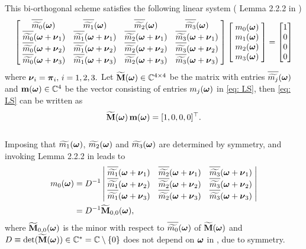 This bi-orthogonal scheme satisfies the following linear system (
Lemma 2.2.2 in \cite{cohen1993compactly} )
\begin{align}\label{eq: LS}
\begin{bmatrix}
    \, \sbarm{0} &  \sbarm{1} &  \sbarm{2} & \sbarm{3}\; \\
    \;\sbarmn{0}{1} & \sbarmn{1}{1}  & \sbarmn{2}{1}  & \sbarmn{3}{1}\; \\
    \;\sbarmn{0}{2} & \sbarmn{1}{2}  & \sbarmn{2}{2}  & \sbarmn{3}{2}\; \\
    \;\sbarmn{0}{3} & \sbarmn{1}{3} & \sbarmn{2}{3} & \sbarmn{3}{3}\;
\end{bmatrix}
\begin{bmatrix}
\;\mo{0}\; \\
\;\mo{1}\; \\
\;\mo{2}\; \\
\;\mo{3}\; 
\end{bmatrix} 
=
\begin{bmatrix}
1\\
0\\
0\\
0
\end{bmatrix}
\end{align}
 where $\boldsymbol{\nu}_i = \boldsymbol{\pi}_i,\, i = 1,2,3.$ %
 Let $\widetilde{\mathbf{M}}(\boldsymbol{\omega})\in\mathbb{C}^{4\times 4}$ be the matrix with entries $\sbarm{j}$ and $\mathbf{m}(\boldsymbol{\omega})\in\mathbb{C}^4$ be the vector consisting of entries $m_j(\boldsymbol{\omega})$ in \eqref{eq: LS}, then \eqref{eq: LS} can be written as \[\widetilde{\mathbf{M}}(\boldsymbol{\omega})\, \mathbf{m} (\boldsymbol{\omega})= [1,0,0,0]^\top.\]\\
Imposing that $\widetilde{m_{1}}(\boldsymbol{\omega})$, $\widetilde{m_{2}}(\boldsymbol{\omega})$ and $\widetilde{m_{3}}(\boldsymbol{\omega})$ are determined by symmetry, and invoking Lemma 2.2.2 in \cite{cohen1993compactly} leads to
\begin{align}\label{eq: m0-sol}
m_0(\V{\omega}) &= D^{-1}%
\left|
\begin{matrix}
    \; \sbarmn{1}{1}  & \sbarmn{2}{1}  & \sbarmn{3}{1}\; \\
    \; \sbarmn{1}{2}  & \sbarmn{2}{2}  & \sbarmn{3}{2}\; \\
    \; \sbarmn{1}{3} & \sbarmn{2}{3} & \sbarmn{3}{3}\;
\end{matrix}
\right| \notag\\
&= D^{-1}\widetilde{\mathbf{M}}_{0,0}(\V{\omega}),
\end{align}
where $\widetilde{\mathbf{M}}_{0,0}(\boldsymbol{\omega})$ is the minor with respect to $\sbarm{0}$ of $\widetilde{\mathbf{M}}(\boldsymbol{\omega})$ and $ D \equiv \det(\widetilde{\mathbf{M}}(\boldsymbol{\omega}))\in \mathbb{C}^* = \mathbb{C}\setminus\{0\}$ does not depend on $\boldsymbol{\omega}$ in \cite{cohen1993compactly}, due to symmetry.
